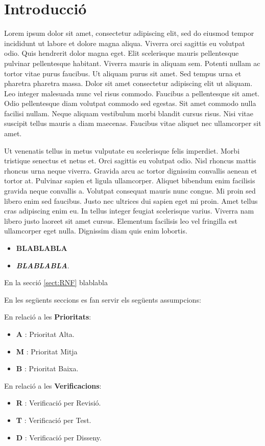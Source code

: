 \section{Introducció}\label{sec:intro}


Lorem ipsum dolor sit amet, consectetur adipiscing elit, sed do eiusmod tempor incididunt ut labore et dolore magna aliqua. Viverra orci sagittis eu volutpat odio. Quis hendrerit dolor magna eget. Elit scelerisque mauris pellentesque pulvinar pellentesque habitant. Viverra mauris in aliquam sem. Potenti nullam ac tortor vitae purus faucibus. Ut aliquam purus sit amet. Sed tempus urna et pharetra pharetra massa. Dolor sit amet consectetur adipiscing elit ut aliquam. Leo integer malesuada nunc vel risus commodo. Faucibus a pellentesque sit amet. Odio pellentesque diam volutpat commodo sed egestas. Sit amet commodo nulla facilisi nullam. Neque aliquam vestibulum morbi blandit cursus risus. Nisi vitae suscipit tellus mauris a diam maecenas. Faucibus vitae aliquet nec ullamcorper sit amet.

Ut venenatis tellus in metus vulputate eu scelerisque felis
imperdiet. Morbi tristique senectus et netus et. Orci sagittis eu
volutpat odio. Nisl rhoncus mattis rhoncus urna neque viverra. Gravida
arcu ac tortor dignissim convallis aenean et tortor at. Pulvinar
sapien et ligula ullamcorper. Aliquet bibendum enim facilisis gravida
neque convallis a. Volutpat consequat mauris nunc congue. Mi proin sed
libero enim sed faucibus. Justo nec ultrices dui sapien eget mi
proin. Amet tellus cras adipiscing enim eu. In tellus integer feugiat
scelerisque varius. Viverra nam libero justo laoreet sit amet
cursus. Elementum facilisis leo vel fringilla est ullamcorper eget
nulla. Dignissim diam quis enim lobortis.

\begin{itemize}
\item  \textbf{BLABLABLA}
\item  \textit{\textbf{BLABLABLA}}.
\end{itemize}

En la secció \ref{sect:RNF} blablabla \newline \newline

En les següents seccions es fan servir els següents assumpcions:

En relació a les \textbf{Prioritats}:

\begin{itemize}
\item  \textbf{A} : Prioritat Alta.
\item  \textbf{M} : Prioritat Mitja
\item  \textbf{B} : Prioritat Baixa.
\end{itemize}

En relació a les \textbf{Verificacions}:

\begin{itemize}
\item  \textbf{R} : Verificació per Revisió.
\item  \textbf{T} : Verificació per Test.
\item  \textbf{D} : Verificació per Disseny.
\end{itemize}
